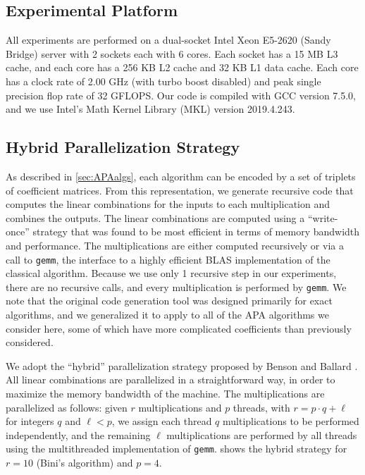 \documentclass[conference]{IEEEtran}
\begin{document}
\subsection{Experimental Platform}

All experiments are performed on a dual-socket Intel Xeon E5-2620 (Sandy Bridge) server with 2 sockets each with 6 cores. 
Each socket has a 15 MB L3 cache, and each core has a 256 KB L2 cache and 32 KB L1 data cache. 
Each core has a clock rate of 2.00 GHz (with turbo boost disabled) and peak single precision flop rate of 32 GFLOPS. 
Our code is compiled with GCC version 7.5.0, 
and we use Intel's Math Kernel Library (MKL) version 2019.4.243.

\subsection{Hybrid Parallelization Strategy}

As described in \cref{sec:APAalgs}, each algorithm can be encoded by a set of triplets of coefficient matrices.
From this representation, we generate recursive code that computes the linear combinations for the inputs to each multiplication and combines the outputs.
The linear combinations are computed using a ``write-once'' strategy that was found to be most efficient in terms of memory bandwidth and performance.
The multiplications are either computed recursively or via a call to \texttt{gemm}, the interface to a highly efficient BLAS implementation of the classical algorithm.
Because we use only 1 recursive step in our experiments, there are no recursive calls, and every multiplication is performed by \texttt{gemm}.
We note that the original code generation tool was designed primarily for exact algorithms, and we generalized it to apply to all of the APA algorithms we consider here, some of which have more complicated coefficients than previously considered.

We adopt the ``hybrid'' parallelization strategy proposed by Benson and Ballard \cite{BB15}.
All linear combinations are parallelized in a straightforward way, in order to maximize the memory bandwidth of the machine.
The multiplications are parallelized as follows: given $r$ multiplications and $p$ threads, with $r=p\cdot q + \ell$ for integers $q$ and $\ell<p$, we assign each thread $q$ multiplications to be performed independently, and the remaining $\ell$ multiplications are performed by all threads using the multithreaded implementation of \texttt{gemm}.
 shows the hybrid strategy for $r=10$ (Bini's algorithm) and $p=4$.
\end{document}
